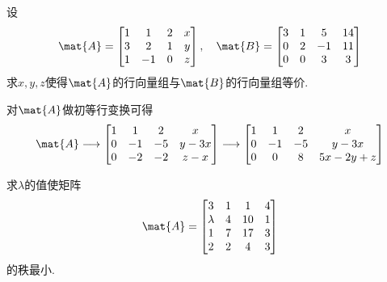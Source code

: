 \documentclass{ctexart}
\begin{document}
\begin{problem}
    设
    \[\mat{A}=\begin{bmatrix}
        1&1&2&x\\3&2&1&y\\1&-1&0&z
    \end{bmatrix},\quad\mat{B}=\begin{bmatrix}
        3&1&5&14\\0&2&-1&11\\0&0&3&3
    \end{bmatrix}\]
    求$x,y,z$使得$\mat{A}$的行向量组与$\mat{B}$的行向量组等价.
\end{problem}
\begin{solution}
    对$\mat{A}$做初等行变换可得
    \[\mat{A}\longrightarrow\begin{bmatrix}
        1&1&2&x\\
        0&-1&-5&y-3x\\
        0&-2&-2&z-x
    \end{bmatrix}\longrightarrow\begin{bmatrix}
        1&1&2&x\\
        0&-1&-5&y-3x\\
        0&0&8&5x-2y+z
    \end{bmatrix}\]
\end{solution}
\begin{problem}
    求$\lambda$的值使矩阵
    \[\mat{A}=\begin{bmatrix}
        3&1&1&4\\
        \lambda&4&10&1\\
        1&7&17&3\\
        2&2&4&3
    \end{bmatrix}\]
    的秩最小.
\end{problem}
\end{document}
